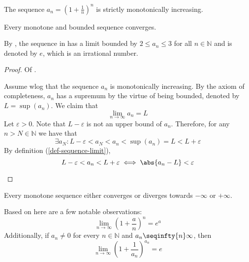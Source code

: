\begin{thm}\label{thm-euler-sequence-monotonicity-increasing}
	The sequence $a_n=\left(1+\tfrac{1}{n}\right)^n$ is strictly monotonically increasing.
\end{thm}

\begin{thm}\label{thm-monotone-bounded-sequence-converges}
	Every monotone and bounded sequence converges.
\end{thm}

\begin{rem}\label{rem-euler-sequence}
	By , the sequence in
	 has a limit bounded
	by $2 \leq a_n \leq 3$ for all $n\in\mathbb{N}$ and is denoted by $e$, which
	is an irrational number.
\end{rem}

\begin{proof}
	Of .
	\begin{flushleft}
		Assume \gls{wlog} that the sequence $a_n$ is monotonically increasing.
		By the axiom of completeness, $a_n$ has a supremum by the virtue of being
		bounded, denoted by $L=\sup(a_n)$. We claim that
		\begin{equation*}
			\lim_{n\to\infty}a_n=L
		\end{equation*}
		Let $\varepsilon>0$. Note that $L-\varepsilon$ is not an upper bound of
		$a_n$. Therefore, for any $n>N\in\mathbb{N}$ we have that
		\begin{equation*}
			\exists a_N: L - \varepsilon < a_N < a_n < \sup(a_n) = L < L + \varepsilon
		\end{equation*}
		By definition (\ref{def-sequence-limit}),
		\begin{equation*}
			L - \varepsilon < a_n < L + \varepsilon \iff \abs{a_n - L} < \varepsilon
		\end{equation*}
	\end{flushleft}
\end{proof}

\begin{thm}\label{thm-monotone-sequence-converges-diverges}
	Every monotone sequence either converges or diverges towards $-\infty$ or $+\infty$.
\end{thm}

\begin{rem}
	Based on  here are
	a few notable observations:
	\begin{equation}\label{eq-euler-limit}
		\lim_{n\to\infty}\left(1+\frac{a}{n}\right)^n=e^a
	\end{equation}
	Additionally, if $a_n\neq0$ for every $n\in\mathbb{N}$ and $a_n \seqinfty{n} \infty$, then
	\begin{equation}
		\lim_{n\to\infty}\left(1+\frac{1}{a_n}\right)^{a_n}=e
	\end{equation}
\end{rem}

